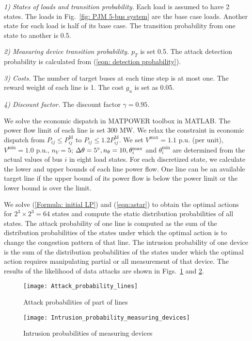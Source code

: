 \documentclass[conference,letterpaper,10pt]{IEEEtran}
\begin{document}
\noindent\textit{1) States of loads and transition probability.}
Each load is assumed to have 2 states. The loads in Fig.~\ref{fig: PJM 5-bus system} are the base case loads. Another state for each load is half of its base case. The transition probability from one state to another is 0.5. 

\noindent\textit{2) Measuring device transition probability.}
$p_T$ is set 0.5. The attack detection probability is calculated from (\ref{eqn: detection probability}).

\noindent\textit{3) Costs.}
 The number of target buses at each time step is at most one. The reward weight of each line is 1. The cost $g_u$ is set as 0.05.

\noindent\textit{4) Discount factor.}
The discount factor $\gamma=0.95$.

We solve the economic dispatch in MATPOWER toolbox in MATLAB. The power flow limit of each line is set 300 MW. We relax the constraint in economic dispatch from $P_{ij}\leq P_{ij}^{\text{M}}$ to $P_{ij}\leq 1.2 P_{ij}^{\text{M}}$. We set $V^{\max}=1.1$ p.u. (per unit), $V^{\min}=1.0$ p.u., $n_V=5$; $\Delta \theta=5\degree, n_{\theta}=10, \theta_i^{\max}$ and $\theta_i^{\min}$ are determined from the actual values of bus $i$ in eight load states.  For each discretized state, we calculate the lower and upper bounds of each line power flow. One line can be an available target line if the upper bound of its power flow is below the power limit or the lower bound is over the limit.

We solve (\ref{Formula: initial LP}) and (\ref{eqn:astar}) to obtain the optimal actions for $2^3\times 2^3=64$ states and compute the static distribution probabilities of all states. The attack probability of one line is computed as the sum of the distribution probabilities of the states under which the optimal action is to change the congestion pattern of that line. The intrusion probability of one device is the sum of the distribution probabilities of the states under which the optimal action requires manipulating partial or all measurement of that device. The results of the likelihood of data attacks are shown in Figs.~\ref{fig: Attack probabilities of lines} and \ref{fig: Intrusion probabilities of devices}.

\vspace{-2mm}
\begin{figure}[h]
	\centering
	\texttt{[image: Attack\_probability\_lines]}
	\caption{Attack probabilities of part of lines } \vspace{-3mm}
	\label{fig: Attack probabilities of lines}
\end{figure}
\vspace{-3mm}
\begin{figure}[h]
	\centering
	\texttt{[image: Intrusion\_probability\_measuring\_devices]}
	\caption{Intrusion probabilities of measuring devices } \vspace{-3mm}
	\label{fig: Intrusion probabilities of devices}
\end{figure}
\end{document}
